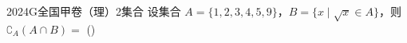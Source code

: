 
\begin{problem}{2024}{G}{全国甲卷（理）}{2}{集合}
设集合 $A=\{1,2,3,4,5,9\}$，$B=\{x\mid \sqrt{x}\in A\}$，则 $\complement_A(A\cap B)=$ (\hspace{1cm})

\begin{choices}
\end{choices}
\end{problem}